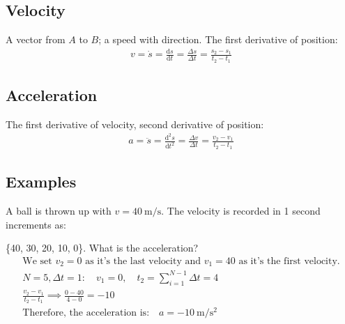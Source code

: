 \documentclass[../Notes.tex]{subfiles}
\begin{document}
    \subsection*{Velocity}

        A vector from $A$ to $B$; a speed with direction. The first derivative of position: 
        \begin{equation*}
            \begin{gathered}
                v = \dot{s} = \frac{\mathrm{d}s}{\mathrm{d}t} = \frac{\Delta s}{\Delta t} = \frac{s_2-s_1}{t_2-t_1}  
            \end{gathered}
        \end{equation*}

    \subsection*{Acceleration}

        The first derivative of velocity, second derivative of position: 
        \begin{equation*}
            \begin{gathered}
                a = \ddot{s} = \frac{\mathrm{d}^2s}{\mathrm{d}t^2} = \frac{\Delta v}{\Delta t} = \frac{v_2-v_1}{t_2-t_1}         
            \end{gathered}
        \end{equation*}

    \subsection*{Examples}

        A ball is thrown up with $v = \SI{40}{\meter/\second}$. The velocity is recorded in 1 second increments as: 

        \{40, 30, 20, 10, 0\}. What is the acceleration? 
        \begin{equation*}
            \begin{gathered}
                \text{We set } v_2 = 0 \text{ as it's the last velocity and } v_1 = 40 \text{ as it's the first velocity.}  \\
                N = 5, \Delta t = 1: \quad v_1 = 0, \quad t_2 = \sum_{i=1}^{N-1}\Delta t = 4  \\
                \frac{v_2-v_1}{t_2-t_1} \implies \frac{0-40}{4-0} = -10 \\
                \text{Therefore, the acceleration is:} \quad \boxed{a = \SI{-10}{\meter/\second^2}}
            \end{gathered}
        \end{equation*}
\end{document}
